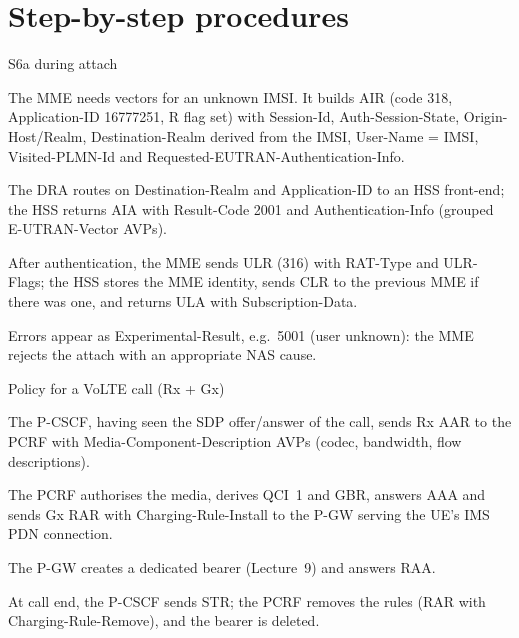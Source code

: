 \documentclass[11pt,a4paper]{article}
\begin{document}
\section{Step-by-step procedures}

\begin{procedurebox}{S6a during attach}\label{proc:s6a}
\begin{steps}
  \item The MME needs vectors for an unknown IMSI. It builds AIR (code 318, Application-ID 16777251,
        R flag set) with Session-Id, Auth-Session-State, Origin-Host/Realm, Destination-Realm derived from the
        IMSI, User-Name = IMSI, Visited-PLMN-Id and Requested-EUTRAN-Authentication-Info.
  \item The DRA routes on Destination-Realm and Application-ID to an HSS front-end; the HSS returns AIA with
        Result-Code 2001 and Authentication-Info (grouped E-UTRAN-Vector AVPs).
  \item After authentication, the MME sends ULR (316) with RAT-Type and ULR-Flags; the HSS stores the MME
        identity, sends CLR to the previous MME if there was one, and returns ULA with Subscription-Data.
  \item Errors appear as Experimental-Result, e.g.\ 5001 (user unknown): the MME rejects the attach with an
        appropriate NAS cause.
\end{steps}
\end{procedurebox}

\begin{acnfigure}
  \caption{S6a exchanges during attach via a Diameter Routing Agent (\cref{proc:s6a}).}
  \label{fig:s6a}
\end{acnfigure}

\begin{procedurebox}{Policy for a VoLTE call (Rx + Gx)}\label{proc:volte}
\begin{steps}
  \item The P-CSCF, having seen the SDP offer/answer of the call, sends Rx AAR to the PCRF with
        Media-Component-Description AVPs (codec, bandwidth, flow descriptions).
  \item The PCRF authorises the media, derives QCI~1 and GBR, answers AAA and sends Gx RAR with
        Charging-Rule-Install to the P-GW serving the UE's IMS PDN connection.
  \item The P-GW creates a dedicated bearer (Lecture~9) and answers RAA.
  \item At call end, the P-CSCF sends STR; the PCRF removes the rules (RAR with Charging-Rule-Remove), and
        the bearer is deleted.
\end{steps}
\end{procedurebox}
\end{document}
